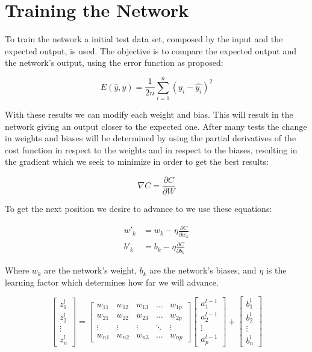 \documentclass[a4paper, 12pt]{amsart}
\begin{document}
\section{Training the Network}
To train the network a initial test data set, composed by the input and the
expected output, is used. The objective is to compare the expected output and
the network's output, using the error function as proposed:

\begin{equation*}
  E(\hat{y}, y) = \frac{1}{2n}\sum_{i=1}^{n} (y_i-\hat{y_i})^2
\end{equation*}

With these results we can modify each weight and bias. This will result in the
network giving an output closer to the expected one. After many tests the
change in weights and biases will be determined by using the partial derivatives
of the cost function in respect to the weights and in respect to the biases,
resulting in the gradient which we seek to minimize in order to get the best
results:

\begin{equation*}
  \nabla C = \frac{\partial C}{\partial W}
\end{equation*}

To get the next position we desire to advance to we use these equations:

\begin{align*}
  w'_k &= w_k - \eta\frac{\partial C}{\partial w_k}\\
  b'_k &= b_k - \eta\frac{\partial C}{\partial b_k}
\end{align*}

Where $w_k$ are the network's weight, $b_k$ are the network's biases, and
$\eta$ is the learning factor which determines how far we will advance.

\begin{equation*}
  \begin{bmatrix}
    z_{1}^{l}\\
    z_{2}^{l}\\
    \vdots\\
    z_{n}^{l}
  \end{bmatrix}
   =
   \begin{bmatrix}
    w_{11} & w_{12} & w_{13} & \dots  & w_{1p} \\
    w_{21} & w_{22} & w_{23} & \dots  & w_{2p} \\
    \vdots & \vdots & \vdots & \ddots & \vdots \\
    w_{n1} & w_{n2} & w_{n3} & \dots  & w_{np}
\end{bmatrix}
   \begin{bmatrix}
    a_{1}^{l-1}\\
    a_{2}^{l-1}\\
    \vdots\\
    a_{p}^{l-1}
  \end{bmatrix}
  +
  \begin{bmatrix}
    b_{1}^{l}\\
    b_{2}^{l}\\
    \vdots\\
    b_{n}^{l}
  \end{bmatrix}
\end{equation*}
\end{document}
